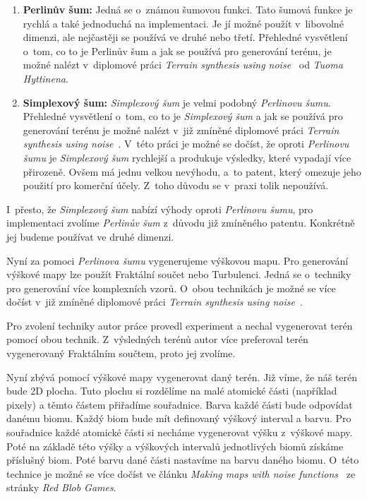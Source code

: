\begin{enumerate}
    \item \textbf{Perlinův šum:} Jedná se o~známou šumovou funkci. Tato šumová funkce je rychlá a také jednoduchá na implementaci. Je jí možné použít v~libovolné dimenzi, ale nejčastěji se používá ve druhé nebo třetí. Přehledné vysvětlení o~tom, co to je Perlinův šum a jak se používá pro generování terénu, je možné nalézt v~diplomové práci \textit{Terrain synthesis using noise}~\cite{TerrainNoise} od \textit{Tuoma Hyttinena}.

    \item \textbf{Simplexový šum:} \textit{Simplexový šum} je velmi podobný \textit{Perlinovu šumu}. Přehledné vysvětlení o~tom, co to je \textit{Simplexový šum} a jak se používá pro generování terénu je možné nalézt v~již zmíněné diplomové práci \textit{Terrain synthesis using noise}~\cite{TerrainNoise}. V~této práci je možné se dočíst, že oproti \textit{Perlinovu šumu} je \textit{Simplexový šum} rychlejší a produkuje výsledky, které vypadají více přirozeně. Ovšem má jednu velkou nevýhodu, a~to patent, který omezuje jeho použití pro komerční účely. Z~toho důvodu se v~praxi tolik nepoužívá.
\end{enumerate}

I~přesto, že \textit{Simplexový šum} nabízí výhody oproti \textit{Perlinovu šumu}, pro implementaci zvolíme \textit{Perlinův šum} z~důvodu již zmíněného patentu. Konkrétně jej budeme používat ve druhé dimenzi.

Nyní za pomoci \textit{Perlinova šumu} vygenerujeme výškovou mapu. Pro generování výškové mapy lze použít Fraktální součet nebo Turbulenci. Jedná se o~techniky pro generování více komplexních vzorů. O~obou technikách je možné se více dočíst v~již zmíněné diplomové práci \textit{Terrain synthesis using noise}~\cite{TerrainNoise}.

Pro zvolení techniky autor práce provedl experiment a nechal vygenerovat terén pomocí obou technik. Z~výsledných terénů autor více preferoval terén vygenerovaný Fraktálním součtem, proto jej zvolíme.

Nyní zbývá pomocí výškové mapy vygenerovat daný terén. Již víme, že náš terén bude 2D plocha. Tuto plochu si rozdělíme na malé atomické části (například pixely) a těmto částem přiřadíme souřadnice. Barva každé části bude odpovídat danému biomu. Každý biom bude mít definovaný výškový interval a barvu. Pro souřadnice každé atomické části si necháme vygenerovat výšku z~výškové mapy. Poté na základě této výšky a výškových intervalů jednotlivých biomů získáme příslušný biom. Poté barvu dané části nastavíme na barvu daného biomu. O~této technice je možné se více dočíst ve článku \textit{Making maps with noise functions}~\cite{TerrainHeightMap} ze stránky \textit{Red Blob Games}.

